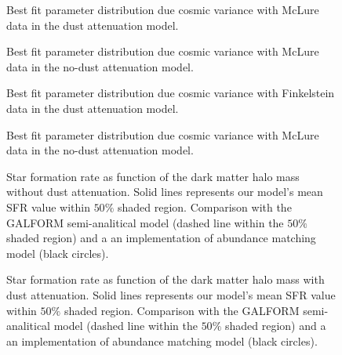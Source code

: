\documentclass{emulateapj}
\begin{document}

\begin{figure}
\caption{Best fit parameter distribution due cosmic variance with McLure data in the dust
 attenuation model.}
\label{fig:OD3_CosmicVar1_w_dust}
\end{figure}


\begin{figure}
\caption{Best fit parameter distribution due cosmic variance with McLure data in the no-dust
 attenuation model.}
\label{fig:OD3_CosmicVar1_wo_dust}
\end{figure}




\begin{figure}
\caption{Best fit parameter distribution due cosmic variance with Finkelstein data in the dust
 attenuation model.}
\label{fig:OD4_CosmicVar1_w_dust}
\end{figure}

\begin{figure}
\caption{Best fit parameter distribution due cosmic variance with McLure data in the no-dust
 attenuation model.}
\label{fig:OD3_CosmicVar1_wo_dust}
\end{figure}





\begin{figure}
\caption{Star formation rate as function of the dark matter halo mass without dust attenuation. 
Solid lines represents our model's mean SFR value within $50\%$  shaded region. 
Comparison with the GALFORM semi-analitical model \citep{Gonzalez14} (dashed line within the 
$50\%$ shaded region) and a an implementation of abundance matching model \citep{Behroozi13}
(black circles). }
\label{fig:SFR_DMHM_wo}
\end{figure}

\begin{figure}
\caption{Star formation rate as function of the dark matter halo mass with dust attenuation. 
Solid lines represents our model's mean SFR value within $50\%$  shaded region. 
Comparison with the GALFORM semi-analitical model \citep{Gonzalez14} (dashed line within the 
$50\%$ shaded region) and a an implementation of abundance matching model \citep{Behroozi13}
(black circles). }
\label{fig:_SFR_DMHM_w}
\end{figure}
\end{document}
